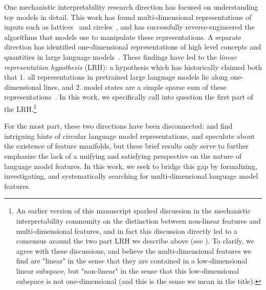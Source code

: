\documentclass{article} %
\theoremstyle{plain}
\theoremstyle{definition}
\begin{document}
One mechanistic interpretability research direction has focused on understanding toy models in detail. This work has found multi-dimensional representations of inputs such as lattices~\citep{michaud2024opening} and circles~\citep{ziming_grokking, neel_grokking}, and has successfully reverse-engineered the algorithms that models use to manipulate these representations. A separate direction has identified one-dimensional representations of high level concepts and quantities in large language models~\citep{space_time, linear_truth_sam, monotonic_numeric_representations, dictionary_monosemanticity_anthropic}. These findings have led to the \textit{linear representation hypothesis} (LRH): a hypothesis which has historically claimed both that 1. all representations in pretrained large language models lie along one-dimensional lines, and 2. model states are a simple sparse sum of these representations~\citep{linear_representation_hypothesis, dictionary_monosemanticity_anthropic}. In this work, we specifically call into question the first part of the LRH.\footnote{An earlier version of this manuscript sparked discussion in the mechanistic interpretability community on the distinction between non-linear features and multi-dimensional features, and in fact this discussion directly led to a consensus around the two part LRH we describe above (see \citep{olah2024linear, csordas2024recurrent, mendel2024geometry, kantamneni2025language}). To clarify, we agree with these discussions, and believe the multi-dimensional features we find are "linear" in the sense that they are contained in a low-dimensional linear subspace, but "non-linear" in the sense that this low-dimensional subspace is not one-dimensional (and this is the sense we mean in the title).}
%

For the most part, these two directions have been disconnected: \cite{yedidate2023helix1} and \cite{successor_heads} find intriguing hints of circular language model representations, and \cite{dictionary_monosemanticity_anthropic} speculate about the existence of feature manifolds, but these brief results only serve to further emphasize the lack of a unifying and satisfying perspective on the nature of language model features. In this work, we seek to bridge this gap by formalizing, investigating, and systematically searching for multi-dimensional language model features.
\end{document}
